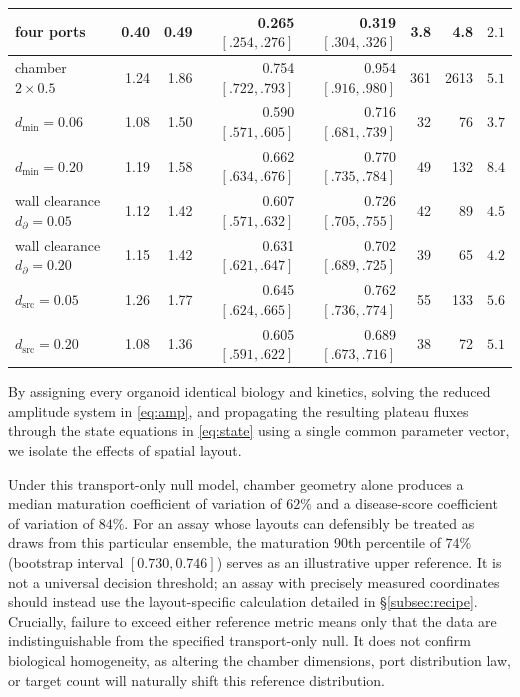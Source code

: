\documentclass[pdflatex,sn-mathphys-num]{sn-jnl}
\numberwithin{equation}{section}
\theoremstyle{thmstyleone}%
\theoremstyle{definition}
\theoremstyle{remark}
\begin{document}
\begin{table}[htbp]
\begin{tabular}{@{}l|rr|rr|rr|r@{}}
four ports&0.40&0.49&0.265 \tiny$[.254,.276]$&0.319 \tiny$[.304,.326]$&3.8&4.8&$2.1$\\
\midrule
chamber $2\times0.5$&1.24&1.86&0.754 \tiny$[.722,.793]$&0.954 \tiny$[.916,.980]$&361&2613&$5.1$\\
$d_{\min}=0.06$&1.08&1.50&0.590 \tiny$[.571,.605]$&0.716 \tiny$[.681,.739]$&32&76&$3.7$\\
$d_{\min}=0.20$&1.19&1.58&0.662 \tiny$[.634,.676]$&0.770 \tiny$[.735,.784]$&49&132&$8.4$\\
\midrule
wall clearance $d_\partial=0.05$&1.12&1.42&0.607 \tiny$[.571,.632]$&0.726 \tiny$[.705,.755]$&42&89&$4.5$\\
wall clearance $d_\partial=0.20$&1.15&1.42&0.631 \tiny$[.621,.647]$&0.702 \tiny$[.689,.725]$&39&65&$4.2$\\
$d_{\mathrm{src}}=0.05$&1.26&1.77&0.645 \tiny$[.624,.665]$&0.762 \tiny$[.736,.774]$&55&133&$5.6$\\
$d_{\mathrm{src}}=0.20$&1.08&1.36&0.605 \tiny$[.591,.622]$&0.689 \tiny$[.673,.716]$&38&72&$5.1$\\
\bottomrule
\end{tabular}
\end{table}

By assigning every organoid identical biology and kinetics, solving the reduced amplitude system in \eqref{eq:amp}, and propagating the resulting plateau fluxes through the state equations in \eqref{eq:state} using a single common parameter vector, we isolate the effects of spatial layout.

Under this transport-only null model, chamber geometry alone produces a median maturation coefficient of variation of $62\%$ and a disease-score coefficient of variation of $84\%$. For an assay whose layouts can defensibly be treated as draws from this particular ensemble, the maturation 90th percentile of $74\%$ (bootstrap interval $[0.730,0.746]$) serves as an illustrative upper reference. It is not a universal decision threshold; an assay with precisely measured coordinates should instead use the layout-specific calculation detailed in \S\ref{subsec:recipe}. Crucially, failure to exceed either reference metric means only that the data are indistinguishable from the specified transport-only null. It does not confirm biological homogeneity, as altering the chamber dimensions, port distribution law, or target count will naturally shift this reference distribution.
\end{document}
